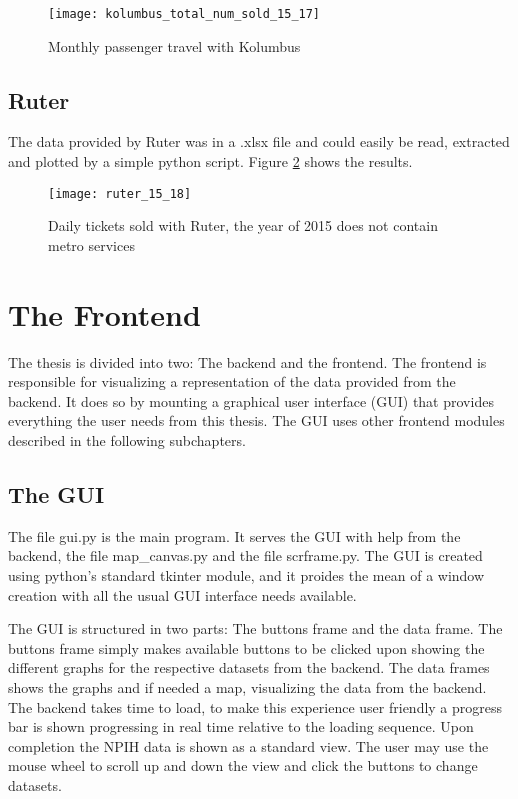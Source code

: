 \begin{figure}[ht]
\texttt{[image: kolumbus\_total\_num\_sold\_15\_17]}
\centering
\caption{Monthly passenger travel with Kolumbus}
\label{fig:kolumbus_15_17}
\end{figure}

\subsection{Ruter}
The data provided by Ruter was in a .xlsx file and could easily be read, extracted and plotted by a simple python script. Figure \ref{fig:ruter_15_18} shows the results.

\begin{figure}[ht]
\texttt{[image: ruter\_15\_18]}
\centering
\caption{Daily tickets sold with Ruter, the year of 2015 does not contain metro services}
\label{fig:ruter_15_18}
\end{figure}


\section{The Frontend}
The thesis is divided into two: The backend and the frontend. The frontend is responsible for visualizing a representation of the data provided from the backend. It does so by mounting a graphical user interface (GUI) that provides everything the user needs from this thesis. The GUI uses other frontend modules described in the following subchapters.

\subsection{The GUI}
The file gui.py is the main program. It serves the GUI with help from the backend, the file map\_canvas.py and the file scrframe.py. The GUI is created using python's standard tkinter module, and it proides the mean of a window creation with all the usual GUI interface needs available. 

The GUI is structured in two parts: The buttons frame and the data frame. The buttons frame simply makes available buttons to be clicked upon showing the different graphs for the respective datasets from the backend. The data frames shows the graphs and if needed a map, visualizing the data from the backend. The backend takes time to load, to make this experience user friendly a progress bar is shown progressing in real time relative to the loading sequence. Upon completion the NPIH data is shown as a standard view. The user may use the mouse wheel to scroll up and down the view and click the buttons to change datasets. 

